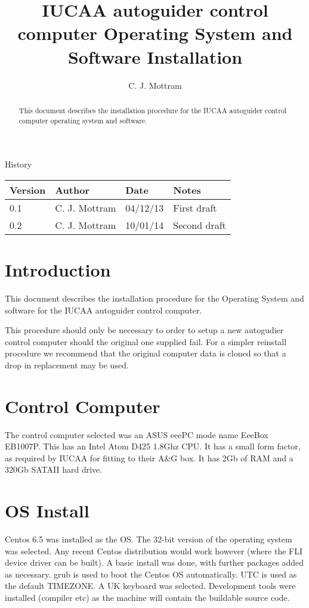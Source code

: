 \documentclass[10pt,a4paper]{article}
\title{IUCAA autoguider control computer Operating System and Software Installation}
\author{C. J. Mottram}
\date{}
\begin{document}
\thispagestyle{empty}
\maketitle
\begin{abstract}
This document describes the installation procedure for the IUCAA autoguider control computer operating system and software.
\end{abstract}
\centerline{\Large History}
\begin{center}
\begin{tabular}{|l|l|l|p{15em}|}
\hline
{\bf Version} & {\bf Author} & {\bf Date} & {\bf Notes} \\
\hline
0.1 & C. J. Mottram & 04/12/13 & First draft \\
0.2 & C. J. Mottram & 10/01/14 & Second draft \\
\hline
\end{tabular}
\end{center}

\newpage
\tableofcontents
\listoffigures
\listoftables
\newpage

\newcommand{\mytilde}{\raise.17ex\hbox{$\scriptstyle\mathtt{\sim}$}}

\section{Introduction}
This document describes the installation procedure for the Operating System and software for the IUCAA autoguider control computer.

This procedure should only be necessary to order to setup a new autogudier control computer should the original one supplied fail. For a simpler reinstall procedure we recommend that the original computer data is cloned so that a drop in replacement may be used.

\section{Control Computer}

The control computer selected was an ASUS eeePC mode name EeeBox EB1007P. This has an Intel Atom D425 1.8Ghz CPU. It has a small form factor, as required by IUCAA for fitting to their A\&G box. It has 2Gb of RAM and a 320Gb SATAII hard drive.

\section{OS Install}
Centos 6.5 was installed as the OS. The 32-bit version of the operating system was selected. Any recent Centos distribution would work however (where the FLI device driver can be built). A basic install was done, with further packages added as necessary. grub is used to boot the Centos OS automatically. UTC is used as the default TIMEZONE. A UK keyboard was selected. Development tools were installed (compiler etc) as the machine will contain the buildable source code.
\end{document}
